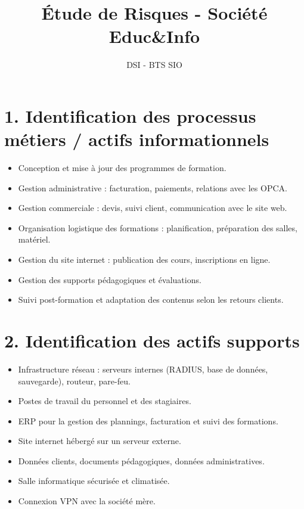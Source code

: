 \documentclass[a4paper,12pt]{article}
\title{Étude de Risques - Société Educ\&Info}
\author{DSI - BTS SIO}
\date{}
\begin{document}
\maketitle

\section*{1. Identification des processus métiers / actifs informationnels}
\begin{itemize}
    \item Conception et mise à jour des programmes de formation.
    \item Gestion administrative : facturation, paiements, relations avec les OPCA.
    \item Gestion commerciale : devis, suivi client, communication avec le site web.
    \item Organisation logistique des formations : planification, préparation des salles, matériel.
    \item Gestion du site internet : publication des cours, inscriptions en ligne.
    \item Gestion des supports pédagogiques et évaluations.
    \item Suivi post-formation et adaptation des contenus selon les retours clients.
\end{itemize}

\section*{2. Identification des actifs supports}
\begin{itemize}
    \item Infrastructure réseau : serveurs internes (RADIUS, base de données, sauvegarde), routeur, pare-feu.
    \item Postes de travail du personnel et des stagiaires.
    \item ERP pour la gestion des plannings, facturation et suivi des formations.
    \item Site internet hébergé sur un serveur externe.
    \item Données clients, documents pédagogiques, données administratives.
    \item Salle informatique sécurisée et climatisée.
    \item Connexion VPN avec la société mère.
\end{itemize}
\end{document}
